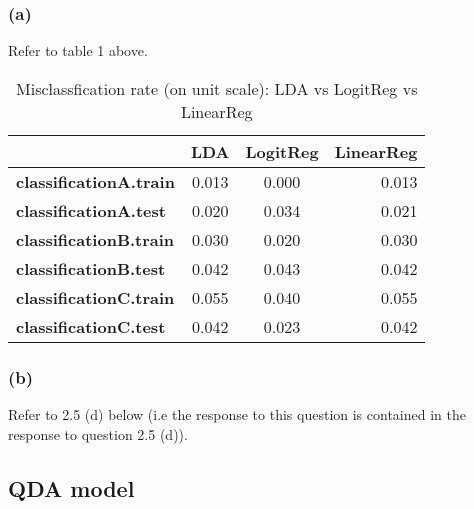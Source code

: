 \documentclass[9pt]{article}
\begin{document}
\subsubsection{(a)}
Refer to table 1 above.
\begin{table}
\centering
\caption{Misclassfication rate (on unit scale): LDA vs LogitReg vs LinearReg}
\begin{tabular}{|l|| c|c| r|}
  \hline
      \textbf{ } & \textbf{LDA} & \textbf{LogitReg} & \textbf{LinearReg}\\
\hline\hline

  \textbf{classificationA.train} & 0.013 & 0.000 & 0.013\\
\hline
\textbf{classificationA.test} & 0.020 & 0.034 & 0.021\\
\hline
\textbf{classificationB.train} & 0.030 & 0.020 & 0.030\\
\hline
\textbf{classificationB.test} & 0.042 & 0.043 & 0.042\\
\hline
\textbf{classificationC.train} & 0.055 & 0.040 & 0.055\\
\hline
\textbf{classificationC.test} & 0.042 & 0.023 & 0.042\\
  \hline
\end{tabular}

\end{table}
\subsubsection{(b)}
Refer to 2.5 (d) below (i.e the response to this question is contained in the response to question 2.5 (d)).
\subsection{QDA model}
\end{document}
